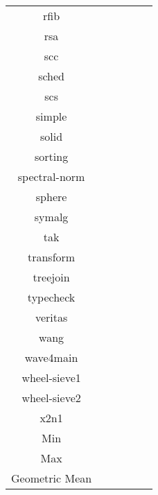 \begin{tabular}{ c c c c c c }
rfib &  &  &  &  & \\
rsa &  &  &  &  & \\
scc &  &  &  &  & \\
sched &  &  &  &  & \\
scs &  &  &  &  & \\
simple &  &  &  &  & \\
solid &  &  &  &  & \\
sorting &  &  &  &  & \\
spectral-norm &  &  &  &  & \\
sphere &  &  &  &  & \\
symalg &  &  &  &  & \\
tak &  &  &  &  & \\
transform &  &  &  &  & \\
treejoin &  &  &  &  & \\
typecheck &  &  &  &  & \\
veritas &  &  &  &  & \\
wang &  &  &  &  & \\
wave4main &  &  &  &  & \\
wheel-sieve1 &  &  &  &  & \\
wheel-sieve2 &  &  &  &  & \\
x2n1 &  &  &  &  & \\
\hline
Min &  &  &  &  & \\
Max &  &  &  &  & \\
Geometric Mean &  &  &  &  & \\


\end{tabular}
\begin{verbatim}

\end{verbatim}
